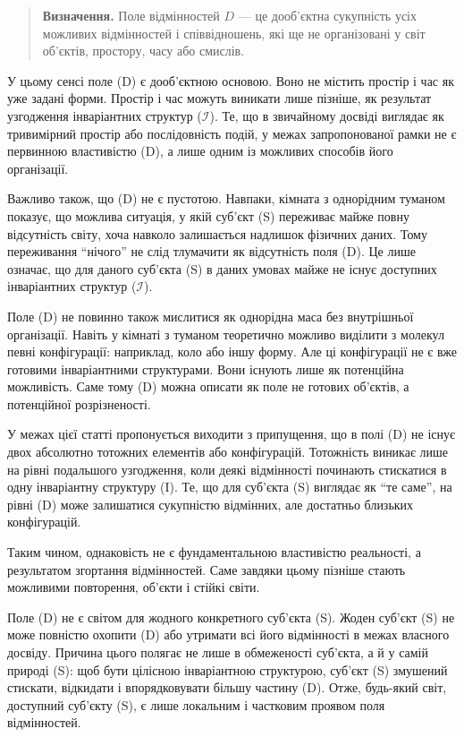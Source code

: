 \documentclass[aps,prd,onecolumn,nofootinbib,superscriptaddress]{revtex4-2}
\begin{document}
\begin{quote}
\textbf{Визначення.}
Поле відмінностей \(D\) — це дооб’єктна сукупність усіх можливих відмінностей і співвідношень, які ще не організовані у світ об’єктів, простору, часу або смислів.
\end{quote}

У цьому сенсі поле (D) є дооб’єктною основою. Воно не містить простір і час як уже задані форми. Простір і час можуть виникати лише пізніше, як результат узгодження інваріантних структур ($\mathcal{I}$). Те, що в звичайному досвіді виглядає як тривимірний простір або послідовність подій, у межах запропонованої рамки не є первинною властивістю (D), а лише одним із можливих способів його організації.

Важливо також, що (D) не є пустотою. Навпаки, кімната з однорідним туманом показує, що можлива ситуація, у якій суб’єкт (S) переживає майже повну відсутність світу, хоча навколо залишається надлишок фізичних даних. Тому переживання “нічого” не слід тлумачити як відсутність поля (D). Це лише означає, що для даного суб’єкта (S) в даних умовах майже не існує доступних інваріантних структур ($\mathcal{I}$).

Поле (D) не повинно також мислитися як однорідна маса без внутрішньої організації. Навіть у кімнаті з туманом теоретично можливо виділити з молекул певні конфігурації: наприклад, коло або іншу форму. Але ці конфігурації не є вже готовими інваріантними структурами. Вони існують лише як потенційна можливість. Саме тому (D) можна описати як поле не готових об’єктів, а потенційної розрізненості.

У межах цієї статті пропонується виходити з припущення, що в полі (D) не існує двох абсолютно тотожних елементів або конфігурацій. Тотожність виникає лише на рівні подальшого узгодження, коли деякі відмінності починають стискатися в одну інваріантну структуру (I). Те, що для суб’єкта (S) виглядає як “те саме”, на рівні (D) може залишатися сукупністю відмінних, але достатньо близьких конфігурацій.

Таким чином, однаковість не є фундаментальною властивістю реальності, а результатом згортання відмінностей. Саме завдяки цьому пізніше стають можливими повторення, об’єкти і стійкі світи.

Поле (D) не є світом для жодного конкретного суб’єкта (S). Жоден суб’єкт (S) не може повністю охопити (D) або утримати всі його відмінності в межах власного досвіду. Причина цього полягає не лише в обмеженості суб’єкта, а й у самій природі (S): щоб бути цілісною інваріантною структурою, суб’єкт (S) змушений стискати, відкидати і впорядковувати більшу частину (D). Отже, будь-який світ, доступний суб’єкту (S), є лише локальним і частковим проявом поля відмінностей.
\end{document}

